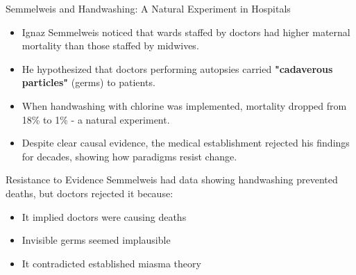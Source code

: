 \documentclass{beamer}
\begin{document}
	\begin{frame}{Semmelweis and Handwashing: A Natural Experiment in Hospitals}
		\begin{itemize}
			\item Ignaz Semmelweis noticed that wards staffed by doctors had higher maternal mortality than those staffed by midwives.
			\item He hypothesized that doctors performing autopsies carried \textbf{"cadaverous particles"} (germs) to patients.
			\item When handwashing with chlorine was implemented, mortality dropped from 18\% to 1\% - a natural experiment.
			\item Despite clear causal evidence, the medical establishment rejected his findings for decades, showing how paradigms resist change.
		\end{itemize}
		
		\begin{alertblock}{Resistance to Evidence}
			Semmelweis had data showing handwashing prevented deaths, but doctors rejected it because:
			\begin{itemize}
				\item It implied doctors were causing deaths
				\item Invisible germs seemed implausible
				\item It contradicted established miasma theory
			\end{itemize}
		\end{alertblock}
	\end{frame}
	
\end{document}
